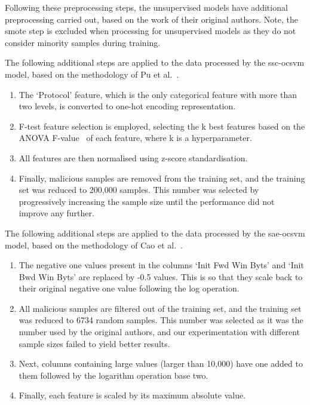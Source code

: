 Following these preprocessing steps, the unsupervised models have additional
preprocessing carried out, based on the work of their original authors. Note,
the \gls{smote} step is excluded when processing for unsupervised models as
they do not consider minority samples during training.

The following additional steps are applied to the data processed by the
\gls{ssc}-\gls{ocsvm} model, based on the methodology of Pu et al.~\cite{Cao}.
\begin{enumerate}
      \item The `Protocol' feature, which is the only categorical feature with more than
            two levels, is converted to one-hot encoding representation.
      \item F-test feature selection is employed, selecting the k best features based on
            the ANOVA F-value~\cite{f_test} of each feature, where k is a hyperparameter.
      \item All features are then normalised using z-score standardisation.
      \item Finally, malicious samples are removed from the training set, and the training
            set was reduced to 200,000 samples. This number was selected by progressively
            increasing the sample size until the performance did not improve any further.
\end{enumerate}

The following additional steps are applied to the data processed by the
\gls{sae}-\gls{ocsvm} model, based on the methodology of Cao et al.~\cite{Cao}.
\begin{enumerate}
      \item The negative one values present in the columns `Init Fwd Win Byts' and `Init
            Bwd Win Byts' are replaced by -0.5 values. This is so that they scale back to
            their original negative one value following the log operation.
      \item All malicious samples are filtered out of the training set, and the training
            set was reduced to 6734 random samples. This number was selected as it was the
            number used by the original authors, and our experimentation with different
            sample sizes failed to yield better results.
      \item Next, columns containing large values (larger than 10,000) have one added to
            them followed by the logarithm operation base two.
      \item Finally, each feature is scaled by its maximum absolute value.
\end{enumerate}

